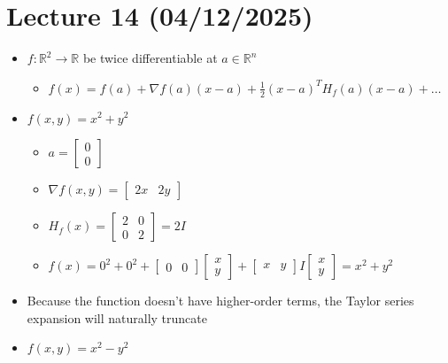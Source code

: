 \documentclass{article}
\begin{document}
\section{Lecture 14 (04/12/2025)}
\begin{itemize}
    \item $f: \mathbb{R}^2 \rightarrow \mathbb{R}$ be twice differentiable at $a \in \mathbb{R}^n$
    \begin{itemize}
        \item $f(x) = f(a) + \nabla f(a) (x-a) +\frac{1}{2} 
        (x-a)^T H_f(a) (x-a) + \dots$
    \end{itemize}
    \item $f(x,y) = x^2 + y^2$
    \begin{itemize}
        \item $a = \left[ \begin{array}{c}
            0 \\ 0
        \end{array} \right]$
        \item $\nabla f(x,y) = \left[ \begin{array}{cc}
            2x & 2y
        \end{array} \right]$
        \item $H_f(x) = \left[ \begin{array}{cc}
            2 & 0 \\
            0 & 2
        \end{array} \right] = 2I$
        \item $f(x) = 0^2 + 0^2 + \left[ \begin{array}{cc}
            0 & 0
        \end{array}\right] \left[ \begin{array}{c}
            x \\ y
        \end{array} \right] + \left[ \begin{array}{cc}
            x & y
        \end{array}\right] I \left[ \begin{array}{c}
            x \\ y
        \end{array} \right] = x^2 + y^2$
    \end{itemize}
    \item Because the function doesn't have higher-order terms, the Taylor series expansion will naturally truncate
    \item $f(x,y) = x^2 - y^2$
    \begin{itemize}

\end{itemize}
\end{itemize}
\end{document}
